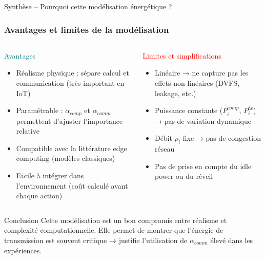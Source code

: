 \documentclass[aspectratio=169]{beamer}
\begin{document}
\begin{frame}{Synthèse – Pourquoi cette modélisation énergétique ?}
\frametitle{Avantages et limites de la modélisation}

\begin{columns}[T]
    \begin{block}{\textcolor{teal}{Avantages}}
    \begin{itemize}
        \item Réalisme physique : sépare calcul et communication (très important en IoT)
        \item Paramétrable : $\alpha_{comp}$ et $\alpha_{comm}$ permettent d’ajuster l’importance relative
        \item Compatible avec la littérature edge computing (modèles classiques)
        \item Facile à intégrer dans l’environnement (coût calculé avant chaque action)
    \end{itemize}
    \end{block}

    \begin{alertblock}{\textcolor{red}{Limites et simplifications}}
    \begin{itemize}
        \item Linéaire → ne capture pas les effets non-linéaires (DVFS, leakage, etc.)
        \item Puissance constante ($P_i^{comp}$, $P_i^{tx}$) → pas de variation dynamique
        \item Débit $\rho_i$ fixe → pas de congestion réseau
        \item Pas de prise en compte du idle power ou du réveil
    \end{itemize}
    \end{alertblock}
\end{columns}

\small
\begin{block}{Conclusion}
Cette modélisation est un bon compromis entre réalisme et complexité computationnelle.  
Elle permet de montrer que l’énergie de transmission est souvent critique → justifie l’utilisation de $\alpha_{comm}$ élevé dans les expériences.
\end{block}
\end{frame}
\end{document}
